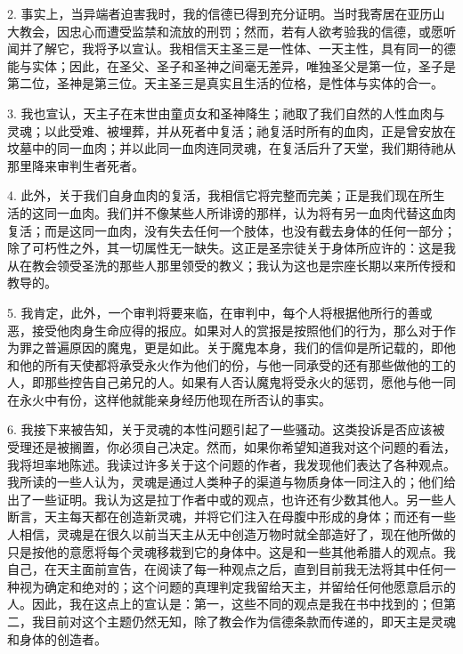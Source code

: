 2. 事实上，当异端者迫害我时，我的信德已得到充分证明。当时我寄居在亚历山大教会，因忠心而遭受监禁和流放的刑罚；然而，若有人欲考验我的信德，或愿听闻并了解它，我将予以宣认。我相信天主圣三是一性体、一天主性，具有同一的德能与实体；因此，在圣父、圣子和圣神之间毫无差异，唯独圣父是第一位，圣子是第二位，圣神是第三位。天主圣三是真实且生活的位格，是性体与实体的合一。\par

3. 我也宣认，天主子在末世由童贞女和圣神降生；祂取了我们自然的人性血肉与灵魂；以此受难、被埋葬，并从死者中复活；祂复活时所有的血肉，正是曾安放在坟墓中的同一血肉；并以此同一血肉连同灵魂，在复活后升了天堂，我们期待祂从那里降来审判生者死者。\par

4. 此外，关于我们自身血肉的复活，我相信它将完整而完美；正是我们现在所生活的这同一血肉。我们并不像某些人所诽谤的那样，认为将有另一血肉代替这血肉复活；而是这同一血肉，没有失去任何一个肢体，也没有截去身体的任何一部分；除了可朽性之外，其一切属性无一缺失。这正是圣宗徒关于身体所应许的：这是我从在教会领受圣洗的那些人那里领受的教义；我认为这也是宗座长期以来所传授和教导的。\par

5. 我肯定，此外，一个审判将要来临，在审判中，每个人将根据他所行的善或恶，接受他肉身生命应得的报应。如果对人的赏报是按照他们的行为，那么对于作为罪之普遍原因的魔鬼，更是如此。关于魔鬼本身，我们的信仰是所记载的，即他和他的所有天使都将承受永火作为他们的份，与他一同承受的还有那些做他的工的人，即那些控告自己弟兄的人。如果有人否认魔鬼将受永火的惩罚，愿他与他一同在永火中有份，这样他就能亲身经历他现在所否认的事实。\par

6. 我接下来被告知，关于灵魂的本性问题引起了一些骚动。这类投诉是否应该被受理还是被搁置，你必须自己决定。然而，如果你希望知道我对这个问题的看法，我将坦率地陈述。我读过许多关于这个问题的作者，我发现他们表达了各种观点。我所读的一些人认为，灵魂是通过人类种子的渠道与物质身体一同注入的；他们给出了一些证明。我认为这是拉丁作者中或的观点，也许还有少数其他人。另一些人断言，天主每天都在创造新灵魂，并将它们注入在母腹中形成的身体；而还有一些人相信，灵魂是在很久以前当天主从无中创造万物时就全部造好了，现在他所做的只是按他的意愿将每个灵魂移栽到它的身体中。这是和一些其他希腊人的观点。我自己，在天主面前宣告，在阅读了每一种观点之后，直到目前我无法将其中任何一种视为确定和绝对的；这个问题的真理判定我留给天主，并留给任何他愿意启示的人。因此，我在这点上的宣认是：第一，这些不同的观点是我在书中找到的；但第二，我目前对这个主题仍然无知，除了教会作为信德条款而传递的，即天主是灵魂和身体的创造者。\par

